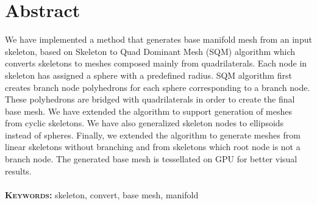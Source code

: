\chapter{Abstract}
We have implemented a method that generates base manifold mesh from an input skeleton, based on Skeleton to Quad Dominant Mesh (SQM) algorithm which converts skeletons to meshes composed mainly from quadrilaterals.
Each node in skeleton has assigned a sphere with a predefined radius.
SQM algorithm first creates branch node polyhedrons for each sphere corresponding to a branch node.
These polyhedrons are bridged with quadrilaterals in order to create the final base mesh.
We have extended the algorithm to support generation of meshes from cyclic skeletons.
We have also generalized skeleton nodes to ellipsoids instead of spheres.
Finally, we extended the algorithm to generate meshes from linear skeletons without branching and from skeletons which root node is not a branch node.
The generated base mesh is tessellated on GPU for better visual results.
\\ \\
\textbf{\textsc{Keywords:}} skeleton, convert, base mesh, manifold
